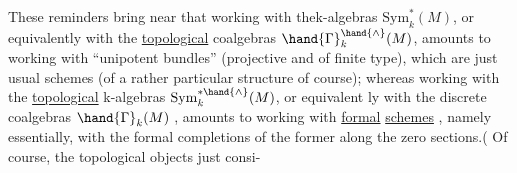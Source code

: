 These reminders bring near that working with thek-algebras
$\mathrm{Sym}_k^{*}(M)$, or equivalently with the \uline{topological} coalgebras $\hand{\Gamma}_k^{\hand{\wedge}}(M)$, amounts
to working with ``unipotent bundles'' (projective and of finite type),
which are just usual schemes (of a rather particular structure of course);
whereas working with the \uline{topological} k-algebras $\mathrm{Sym}_k^{*\hand{\wedge}}(M)$, or equivalent
\hand{-}ly with the discrete coalgebras $\hand{\Gamma}_k(M)$ , amounts to working with \uline{formal}
\uline{schemes} , namely essentially, with the formal completions of the former
along the zero sections.( Of course, the topological objects just consi-


